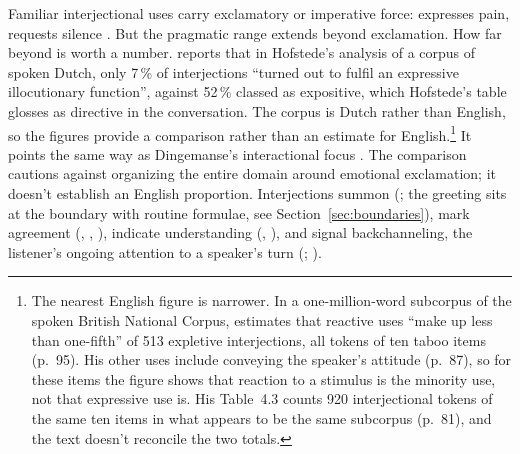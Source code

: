 \documentclass[12pt]{article}
\begin{document}
Familiar interjectional uses carry exclamatory or imperative force:  expresses pain,  requests silence \citep[88, 853]{quirk1985}. But the pragmatic range extends beyond exclamation. How far beyond is worth a number. \textcite[18]{elffers2008} reports that in Hofstede's analysis of a corpus of spoken Dutch, only 7\,\% of interjections \enquote{turned out to fulfil an expressive illocutionary function}, against 52\,\% classed as expositive, which Hofstede's table glosses as directive in the conversation. The corpus is Dutch rather than English, so the figures provide a comparison rather than an estimate for English.\footnote{The nearest English figure is narrower. In a one-million-word subcorpus of the spoken British National Corpus, \textcite[85]{ljung2011} estimates that reactive uses \enquote{make up less than one-fifth} of 513 expletive interjections, all tokens of ten taboo items (p.~95). His other uses include conveying the speaker's attitude (p.~87), so for these items the figure shows that reaction to a stimulus is the minority use, not that expressive use is. His Table~4.3 counts 920 interjectional tokens of the same ten items in what appears to be the same subcorpus (p.~81), and the text doesn't reconcile the two totals.} It points the same way as Dingemanse's interactional focus \citep[259]{dingemanse2024}. The comparison cautions against organizing the entire domain around emotional exclamation; it doesn't establish an English proportion. Interjections summon (; the greeting  sits at the boundary with routine formulae, see Section~\ref{sec:boundaries}), mark agreement (, , ), indicate understanding (, ), and signal backchanneling, the listener's ongoing attention to a speaker's turn (\citealp[868, 873--876]{norrick2009}; \citealp[265]{dingemanse2024}).
\end{document}
